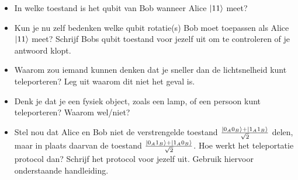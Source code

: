 \documentclass[10pt, a4paper]{article}
\begin{document}
\begin{itemize}

\item In welke toestand is het qubit van Bob wanneer Alice $\ket{11}$ meet?
\item Kun je nu zelf bedenken welke qubit rotatie(s) Bob moet toepassen als Alice $\ket{11}$ meet? Schrijf Bobs qubit toestand voor jezelf uit om te controleren of je antwoord klopt.

\item Waarom zou iemand kunnen denken dat je sneller dan de lichtsnelheid kunt teleporteren? Leg uit waarom dit niet het geval is.

\item Denk je dat je een fysiek object, zoals een lamp, of een persoon kunt teleporteren? Waarom wel/niet?


\item Stel nou dat Alice en Bob niet de verstrengelde toestand $\frac{\ket{0_A0_B}+\ket{1_A1_B}}{\sqrt{2}}$ delen, maar in plaats daarvan de toestand $\frac{\ket{0_A1_B}+\ket{1_A0_B}}{\sqrt{2}}$. Hoe werkt het teleportatie protocol dan? Schrijf het protocol voor jezelf uit. Gebruik hiervoor onderstaande handleiding.
\end{itemize}
\end{document}
